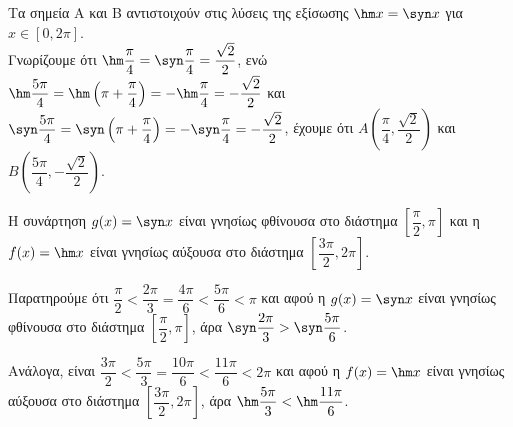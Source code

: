 \begin{alist}
\item Τα σημεία Α και Β αντιστοιχούν στις λύσεις της εξίσωσης $\hm  x = \syn  x$ για $x \in [0, 2\pi]$. \\
Γνωρίζουμε ότι $\hm \dfrac{\pi}{4} = \syn \dfrac{\pi}{4} = \dfrac{\sqrt{2}}{2}$, ενώ $\hm \dfrac{5\pi}{4} = \hm \left(\pi + \dfrac{\pi}{4}\right) = -\hm \dfrac{\pi}{4} = -\dfrac{\sqrt{2}}{2}$ και $\syn \dfrac{5\pi}{4} = \syn \left(\pi + \dfrac{\pi}{4}\right) = -\syn \dfrac{\pi}{4} = -\dfrac{\sqrt{2}}{2}$, έχουμε ότι $A\left(\dfrac{\pi}{4}, \dfrac{\sqrt{2}}{2}\right)$ και $B\left(\dfrac{5\pi}{4}, -\dfrac{\sqrt{2}}{2}\right)$.
\item Η συνάρτηση $g(x) = \syn  x$ είναι γνησίως φθίνουσα στο διάστημα $\left[\dfrac{\pi}{2}, \pi\right]$ και η $f(x) = \hm  x$ είναι γνησίως αύξουσα στο διάστημα $\left[\dfrac{3\pi}{2}, 2\pi\right]$.
\item 
\begin{rlist}
\item Παρατηρούμε ότι $\dfrac{\pi}{2} < \dfrac{2\pi}{3} = \dfrac{4\pi}{6} < \dfrac{5\pi}{6} < \pi$ και αφού η $g(x) = \syn  x$ είναι γνησίως φθίνουσα στο διάστημα $\left[\dfrac{\pi}{2}, \pi\right]$, άρα $\syn \dfrac{2\pi}{3} > \syn \dfrac{5\pi}{6}$.
\item Ανάλογα, είναι $\dfrac{3\pi}{2} < \dfrac{5\pi}{3} = \dfrac{10\pi}{6} < \dfrac{11\pi}{6} < 2\pi$ και αφού η $f(x) = \hm  x$ είναι γνησίως αύξουσα στο διάστημα $\left[\dfrac{3\pi}{2}, 2\pi\right]$, άρα $\hm \dfrac{5\pi}{3} < \hm \dfrac{11\pi}{6}$.
\end{rlist}
\end{alist}

